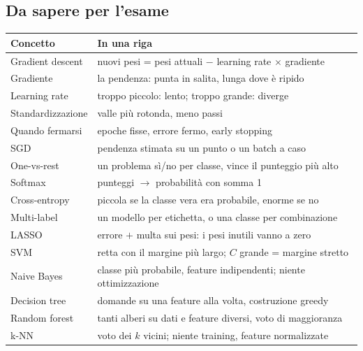 \subsection{Da sapere per l'esame}
\begin{center}
    \begin{tabular}{l|l}
        \textbf{Concetto} & \textbf{In una riga} \\ \hline
        Gradient descent  & nuovi pesi = pesi attuali $-$ learning rate $\times$ gradiente \\ \hline
        Gradiente         & la pendenza: punta in salita, lunga dove è ripido \\ \hline
        Learning rate     & troppo piccolo: lento; troppo grande: diverge \\ \hline
        Standardizzazione & valle più rotonda, meno passi \\ \hline
        Quando fermarsi   & epoche fisse, errore fermo, early stopping \\ \hline
        SGD               & pendenza stimata su un punto o un batch a caso \\ \hline
        One-vs-rest       & un problema sì/no per classe, vince il punteggio più alto \\ \hline
        Softmax           & punteggi $\rightarrow$ probabilità con somma 1 \\ \hline
        Cross-entropy     & piccola se la classe vera era probabile, enorme se no \\ \hline
        Multi-label       & un modello per etichetta, o una classe per combinazione \\ \hline
        LASSO             & errore $+$ multa sui pesi: i pesi inutili vanno a zero \\ \hline
        SVM               & retta con il margine più largo; $C$ grande = margine stretto \\ \hline
        Naive Bayes       & classe più probabile, feature indipendenti; niente ottimizzazione \\ \hline
        Decision tree     & domande su una feature alla volta, costruzione greedy \\ \hline
        Random forest     & tanti alberi su dati e feature diversi, voto di maggioranza \\ \hline
        k-NN              & voto dei $k$ vicini; niente training, feature normalizzate \\
    \end{tabular}
\end{center}
